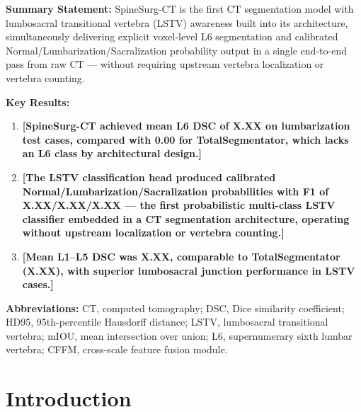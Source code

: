 \documentclass{article}
\newcommand{\ph}[1]{\textcolor{placeholder}{\textbf{[#1]}}}
\begin{document}

\noindent\textbf{Summary Statement:} SpineSurg-CT is the first CT segmentation
model with lumbosacral transitional vertebra (LSTV) awareness built into its
architecture, simultaneously delivering explicit voxel-level L6 segmentation and
calibrated Normal/Lumbarization/Sacralization probability output in a single
end-to-end pass from raw CT --- without requiring upstream vertebra localization
or vertebra counting.

\vspace{0.5em}
\noindent\textbf{Key Results:}
\begin{enumerate}[leftmargin=*,label=\arabic*.,noitemsep]
  \item \ph{SpineSurg-CT achieved mean L6 DSC of X.XX on lumbarization test
    cases, compared with 0.00 for TotalSegmentator, which lacks an L6 class
    by architectural design.}
  \item \ph{The LSTV classification head produced calibrated
    Normal/Lumbarization/Sacralization probabilities with F1 of
    X.XX/X.XX/X.XX --- the first probabilistic multi-class LSTV classifier
    embedded in a CT segmentation architecture, operating without upstream
    localization or vertebra counting.}
  \item \ph{Mean L1--L5 DSC was X.XX, comparable to TotalSegmentator (X.XX),
    with superior lumbosacral junction performance in LSTV cases.}
\end{enumerate}

\vspace{0.5em}
\noindent\textbf{Abbreviations:} CT, computed tomography; DSC, Dice similarity
coefficient; HD95, 95th-percentile Hausdorff distance; LSTV, lumbosacral
transitional vertebra; mIOU, mean intersection over union; L6, supernumerary
sixth lumbar vertebra; CFFM, cross-scale feature fusion module.

\section{Introduction}
\end{document}

